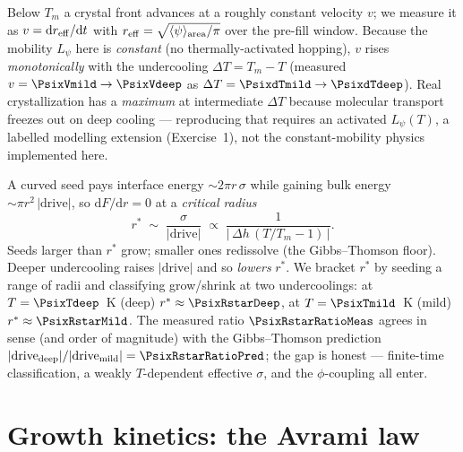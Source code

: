 Below $T_m$ a crystal front advances at a roughly constant velocity
$v$; we measure it as $v=\mathrm{d}r_{\rm eff}/\mathrm{d}t$ with
$r_{\rm eff}=\sqrt{\langle\psi\rangle_{\rm area}/\pi}$ over the pre-fill
window. Because the mobility $L_\psi$ here is \emph{constant} (no
thermally-activated hopping), $v$ rises \emph{monotonically} with the
undercooling $\Delta T=T_m-T$ (measured
$v=\ensuremath{\PsixVmild}\to\ensuremath{\PsixVdeep}$ as
$\Delta T=\ensuremath{\PsixdTmild}\to\ensuremath{\PsixdTdeep}$). Real
crystallization has a \emph{maximum} at intermediate $\Delta T$ because
molecular transport freezes out on deep cooling --- reproducing that
requires an activated $L_\psi(T)$, a labelled modelling extension
(Exercise~1), not the constant-mobility physics implemented here.

A curved seed pays interface energy $\sim 2\pi r\,\sigma$ while gaining
bulk energy $\sim \pi r^2\,|\text{drive}|$, so
$\mathrm{d}F/\mathrm{d}r=0$ at a \emph{critical radius}
%
\begin{equation}
  r^\ast \;\sim\; \frac{\sigma}{|\text{drive}|}
        \;\propto\; \frac{1}{|\,\Delta h\,(T/T_m-1)\,|}.
\end{equation}
%
Seeds larger than $r^\ast$ grow; smaller ones redissolve (the
Gibbs--Thomson floor). Deeper undercooling raises $|\text{drive}|$ and so
\emph{lowers} $r^\ast$. We bracket $r^\ast$ by seeding a range of radii
and classifying grow/shrink at two undercoolings: at $T=\ensuremath{\PsixTdeep}$~K
(deep) $r^\ast\approx\ensuremath{\PsixRstarDeep}$, at
$T=\ensuremath{\PsixTmild}$~K (mild) $r^\ast\approx\ensuremath{\PsixRstarMild}$.
The measured ratio $\ensuremath{\PsixRstarRatioMeas}$ agrees in sense (and
order of magnitude) with the Gibbs--Thomson prediction
$|\text{drive}_{\rm deep}|/|\text{drive}_{\rm mild}|=\ensuremath{\PsixRstarRatioPred}$;
the gap is honest --- finite-time classification, a weakly $T$-dependent
effective $\sigma$, and the $\phi$-coupling all enter.

\section{Growth kinetics: the Avrami law}

